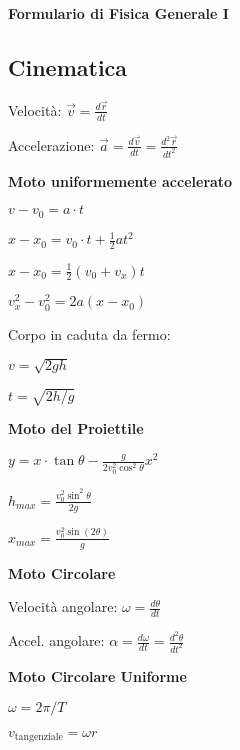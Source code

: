 \documentclass[10pt]{article}
\begin{document}
\columnseprule=1pt

\begin{center}\bfseries
	\Large Formulario di Fisica Generale I 
	
\end{center}

\begin{multicols}{3}


\subsection*{Cinematica}

Velocit\`a: $\vec v = \frac {d\vec r} {dt}$

Accelerazione: $\vec a = \frac {d\vec v} {dt} = \frac {d^2\vec r} {dt^2}$

\textbf{Moto uniformemente accelerato}

$  v - v_{0} = a \cdot t $

$  x - x_0 = v_0\cdot t + \frac 1 2 a t^2 $

$  x - x_0 =  \frac 1 2 ({v_0+v_x}) t $

$  v_x^2 -  v_0^2 = 2 a (x-x_0) $

Corpo in caduta da fermo:

$ v = \sqrt{2gh} $

$ t = \sqrt{2h/g} $

\textbf{Moto del Proiettile}

$\displaystyle y = x\cdot \tan\theta - \frac {g} {2 v_0^2 \cos^2 \theta} x^2$

$\displaystyle h_{max} = \frac {v_0^2 \sin^2\theta} {2 g} $

$\displaystyle x_{max} = \frac {v^2_0 \sin(2\theta)} g $

\textbf{Moto Circolare}

Velocit\`a angolare: $\omega = \frac {d\theta} {dt} $

Accel. angolare: $\alpha = \frac {d\omega} {dt} = \frac{d^2\theta}{dt^2}$

\textbf{Moto Circolare Uniforme}

$  \omega =  {2\pi} / {T} $

$ v_{\mathrm {tangenziale}} = \omega r $


\end{multicols}
\end{document}
